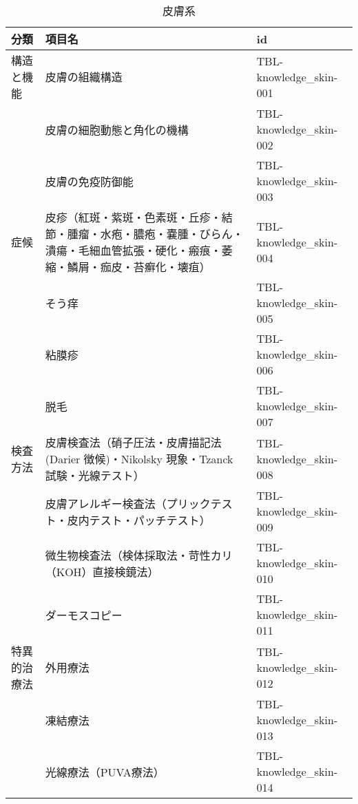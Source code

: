 \begin{xltabular}{\linewidth}{XXX}
\caption{\label{tbl:knowledge_skin}皮膚系} \\
\toprule
分類 & 項目名 & id \\
\midrule
\endhead
構造と機能 & 皮膚の組織構造 & TBL-knowledge_skin-001 \\
 & 皮膚の細胞動態と角化の機構 & TBL-knowledge_skin-002 \\
 & 皮膚の免疫防御能 & TBL-knowledge_skin-003 \\
症候 & 皮疹（紅斑・紫斑・色素斑・丘疹・結節・腫瘤・水疱・膿疱・嚢腫・びらん・潰瘍・毛細血管拡張・硬化・瘢痕・萎縮・鱗屑・痂皮・苔癬化・壊疽） & TBL-knowledge_skin-004 \\
 & そう痒 & TBL-knowledge_skin-005 \\
 & 粘膜疹 & TBL-knowledge_skin-006 \\
 & 脱毛 & TBL-knowledge_skin-007 \\
検査方法 & 皮膚検査法（硝子圧法・皮膚描記法(Darier 徴候)・Nikolsky 現象・Tzanck 試験・光線テスト） & TBL-knowledge_skin-008 \\
 & 皮膚アレルギー検査法（プリックテスト・皮内テスト・パッチテスト） & TBL-knowledge_skin-009 \\
 & 微生物検査法（検体採取法・苛性カリ（KOH）直接検鏡法） & TBL-knowledge_skin-010 \\
 & ダーモスコピー & TBL-knowledge_skin-011 \\
特異的治療法 & 外用療法 & TBL-knowledge_skin-012 \\
 & 凍結療法 & TBL-knowledge_skin-013 \\
 & 光線療法（PUVA療法） & TBL-knowledge_skin-014 \\
\bottomrule
\end{xltabular}

